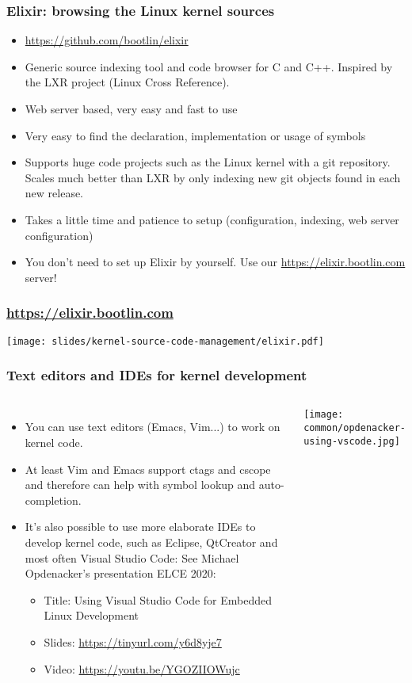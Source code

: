 \begin{frame}
  \frametitle{Elixir: browsing the Linux kernel sources}
  \begin{itemize}
  \item \url{https://github.com/bootlin/elixir}
  \item Generic source indexing tool and code browser for C and C++.
        Inspired by the LXR project (Linux Cross Reference).
  \item Web server based, very easy and fast to use
  \item Very easy to find the declaration, implementation or usage
    of symbols
  \item Supports huge code projects such as the Linux kernel with
     a git repository. Scales much better than LXR  by only indexing
     new git objects found in each new release.
  \item Takes a little time and patience to setup (configuration,
    indexing, web server configuration)
  \item You don't need to set up Elixir by yourself. Use our
    \url{https://elixir.bootlin.com} server!
  \end{itemize}
\end{frame}

\begin{frame}
  \frametitle{\url{https://elixir.bootlin.com}}
  \begin{center}
    \texttt{[image: slides/kernel-source-code-management/elixir.pdf]}
  \end{center}
\end{frame}

\begin{frame}
  \frametitle{Text editors and IDEs for kernel development}
  \begin{columns}
    \begin{itemize}
    \item You can use text editors (Emacs, Vim...) to work on kernel code.
    \item At least Vim and Emacs support ctags and cscope and therefore
          can help with symbol lookup and auto-completion.
    \item It's also possible to use more elaborate IDEs to develop
          kernel code, such as Eclipse, QtCreator and most often
          Visual Studio Code:
          See Michael Opdenacker's presentation ELCE 2020:
          \begin{itemize}
          \item Title: Using Visual Studio Code for Embedded Linux Development
          \item Slides: \url{https://tinyurl.com/y6d8yje7}
          \item Video: \url{https://youtu.be/YGOZIIOWujc}
          \end{itemize}
    \end{itemize}
    \texttt{[image: common/opdenacker-using-vscode.jpg]}
  \end{columns}
\end{frame}

